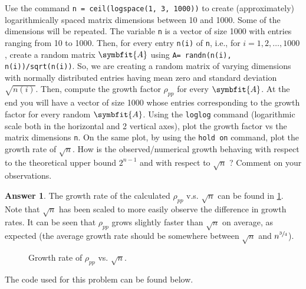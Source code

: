 \documentclass{article}
\theoremstyle{definition}
\newtheorem*{answer}{Answer}
\newcommand{\mat}[1]{\symbfit{#1}}
\begin{document}
\begin{enumerate}[leftmargin=\labelsep]
	      Use the command \texttt{n = ceil(logspace(1, 3, 1000))} to create (approximately) logarithmically spaced matrix dimensions between 10 and 1000. Some of the dimensions will be repeated. The variable \texttt{n} is a vector of size 1000 with entries ranging from 10 to 1000. Then, for every entry \texttt{n(i)} of \texttt{n}, i.e., for \(i = 1, 2, \dots , 1000\), create a random matrix \(\mat{A}\) using \texttt{A= randn(n(i), n(i))/sqrt(n(i))}. So, we are creating a random matrix of varying dimensions with normally distributed entries having mean zero and standard deviation \(\sqrt{n(i)}\). Then, compute the growth factor \(\rho_{pp}\) for every \(\mat{A}\). At the end you will have a vector of size 1000 whose entries corresponding to the growth factor for every random \(\mat{A}\). Using the \texttt{loglog} command (logarithmic scale both in the horizontal and 2 vertical axes), plot the growth factor vs the matrix dimensions \texttt{n}. On the same plot, by using the \texttt{hold on} command, plot the growth rate of \(\sqrt{n}\). How is the observed/numerical growth behaving with respect to the theoretical upper bound \(2^{n-1}\) and with respect to \(\sqrt{n}\) ? Comment on your observations.
	      \begin{answer}
		      The growth rate of the calculated \(\rho_{pp}\) v.s. \(\sqrt{n}\) can be found in \cref{fig:rhopp}. Note that \(\sqrt{n}\) has been scaled to more easily observe the difference in growth rates. It can be seen that \(\rho_{pp}\) grows slightly faster than \(\sqrt{n}\) on average, as expected (the average growth rate should be somewhere between \(\sqrt{n}\) and \(n^{\sfrac{3}{4}}\)).
		      \begin{figure}[H]
			      \centering
			      \caption{Growth rate of \(\rho_{pp}\) vs. \(\sqrt{n}\).}\label{fig:rhopp}
		      \end{figure}

		      The code used for this problem can be found below.
		      \begin{mdframed}[backgroundcolor=lightgray]
		      \end{mdframed}
	      \end{answer}
\end{enumerate}
\end{document}
